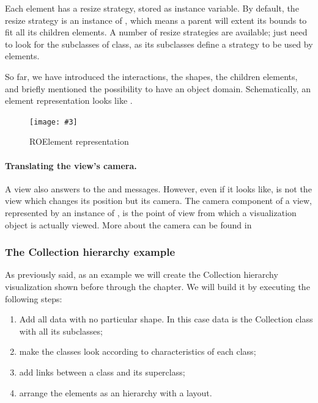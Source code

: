 \documentclass[a4paper,10pt,twoside]{book}
\newcommand{\fig}[4]{
		\begin{figure}[#1]
			\centering
			\texttt{[image: \#3]}
			\caption{\label{fig:#3}#4}
		\end{figure}}
\begin{document}
Each element has a resize strategy, stored as  instance variable.
By default, the resize strategy is an instance of , which means a parent will extent its bounds to fit all its children elements. A number of resize strategies are available; just need to look for the subclasses of  class, as its subclasses define a strategy to be used by elements.

So far, we have introduced the interactions, the shapes, the children elements, and briefly mentioned the possibility to have an object domain. Schematically, an element representation looks like .

\fig{H}{0.5}{ROElementModel}{ROElement representation}

\paragraph{Translating the view's camera.}
A view also answers to the  and  messages. However, even if it looks like, is not the view which changes its position but its camera. The camera component of a view, represented by an instance of , is the point of view from which a visualization object is actually viewed. More about the camera can be found in 

\subsubsection{The Collection hierarchy example}

As previously said, as an example we will create the Collection hierarchy visualization shown before through the chapter. We will build it by executing the following steps:
\begin{enumerate}
\item Add all data with no particular shape. In this case data is the Collection class with all its subclasses;
\item make the classes look according to characteristics of each class;
\item add links between a class and its superclass;
\item arrange the elements as an hierarchy with a layout.
\end{enumerate}
\end{document}
